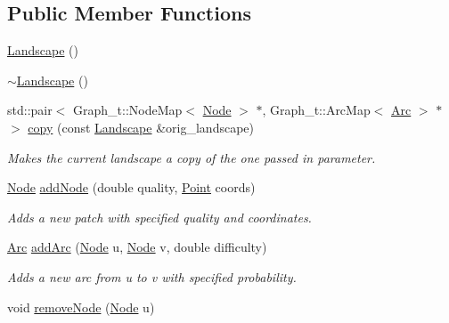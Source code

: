 \subsection*{Public Member Functions}
\begin{DoxyCompactItemize}
\item 
\hyperlink{class_landscape_a0a54d8aabc38c0a5aa27ccace3f91915}{Landscape} ()
\item 
\hyperlink{class_landscape_a44c62eb1b0f84a40f25b9a6445c8b130}{$\sim$\+Landscape} ()
\item 
std\+::pair$<$ Graph\+\_\+t\+::\+Node\+Map$<$ \hyperlink{classconcepts_1_1_abstract_landscape_a7c2f90fb9f42302f1af84a59f4df4b91}{Node} $>$ $\ast$, Graph\+\_\+t\+::\+Arc\+Map$<$ \hyperlink{classconcepts_1_1_abstract_landscape_a0966623f028fe50ac9a3ae114dcf2672}{Arc} $>$ $\ast$ $>$ \hyperlink{class_landscape_a72ac309bcc23cf55888967b4da22ad6f}{copy} (const \hyperlink{class_landscape}{Landscape} \&orig\+\_\+landscape)
\begin{DoxyCompactList}\small\item\em Makes the current landscape a copy of the one passed in parameter. \end{DoxyCompactList}\item 
\hyperlink{classconcepts_1_1_abstract_landscape_a7c2f90fb9f42302f1af84a59f4df4b91}{Node} \hyperlink{class_landscape_a7fbed383ff33eee7dad4be3794a5c38b}{add\+Node} (double quality, \hyperlink{abstract__landscape_8hpp_a9c14bcba65b035519a9c98f1eb1babbe}{Point} coords)
\begin{DoxyCompactList}\small\item\em Adds a new patch with specified quality and coordinates. \end{DoxyCompactList}\item 
\hyperlink{classconcepts_1_1_abstract_landscape_a0966623f028fe50ac9a3ae114dcf2672}{Arc} \hyperlink{class_landscape_a838233aa09155408cd938405aa504289}{add\+Arc} (\hyperlink{classconcepts_1_1_abstract_landscape_a7c2f90fb9f42302f1af84a59f4df4b91}{Node} u, \hyperlink{classconcepts_1_1_abstract_landscape_a7c2f90fb9f42302f1af84a59f4df4b91}{Node} v, double difficulty)
\begin{DoxyCompactList}\small\item\em Adds a new arc from u to v with specified probability. \end{DoxyCompactList}\item 
void \hyperlink{class_landscape_a800ffffd591570d5a19a030707f51365}{remove\+Node} (\hyperlink{classconcepts_1_1_abstract_landscape_a7c2f90fb9f42302f1af84a59f4df4b91}{Node} u)

\end{DoxyCompactItemize}
